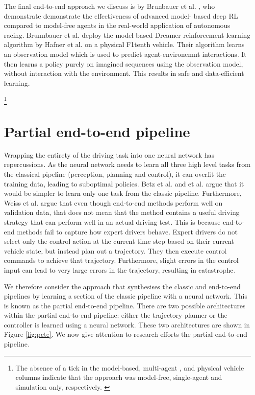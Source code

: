 The final end-to-end approach we discuss is by Brunbauer et al. \cite{brunnbauer}, who demonstrate demonstrate the effectiveness of advanced model- based deep RL compared to model-free agents in the real-world application of autonomous racing.
Brunnbauer et al. \cite{brunnbauer} deploy the model-based Dreamer reinforcement learning algorithm by Hafner et al. \cite{Hafner2019a} on a physical F1tenth vehicle.
Their algorithm learns an observation model which is used to predict agent-environemnt interactions.
It then learns a policy purely on imagined sequences using the observation model, without interaction with the environment.
This results in safe and data-efficient learning.

\begin{landscape}
    
    \footnote{The absence of a tick in the model-based, multi-agent , and physical vehicle columns indicate that the approach was model-free, single-agent and simulation only, respectively. \label{footnote_1}}
\end{landscape}



\section{Partial end-to-end pipeline}
\label{sec:partial_end_to_end}

Wrapping the entirety of the driving task into one neural network has repercussions.
As the neural network needs to learn all three high level tasks from the classical pipeline (perception, planning and control), it can overfit the training data, leading to suboptimal policies.
Betz et al. and \cite{Weiss2020} et al. \cite{Betz2021} argue that it would be simpler to learn only one task from the classic pipeline.
Furthermore, Weiss et al. \cite{Weiss2020} argue that even though end-to-end methods perform well on validation data, that does not mean that the method contains a useful driving strategy that can perform well in an actual driving test.
This is because end-to-end methods fail to capture how expert drivers behave.
Expert drivers do not select only the control action at the current time step based on their current vehicle state, but instead plan out a trajectory. 
They then execute control commands to achieve that trajectory.
Furthermore, slight errors in the control input can lead to very large errors in the trajectory, resulting in catastrophe.

We therefore consider the approach that synthesises the classic and end-to-end pipelines by learning a section of the classic pipeline with a neural network. 
This is known as the partial end-to-end pipeline.
There are two possible architectures within the partial end-to-end pipeline: either the trajectory planner or the controller is learned using a neural network. 
These two architectures are shown in Figure \ref{fig:pete}.
We now give attention to research efforts the partial end-to-end pipeline.

